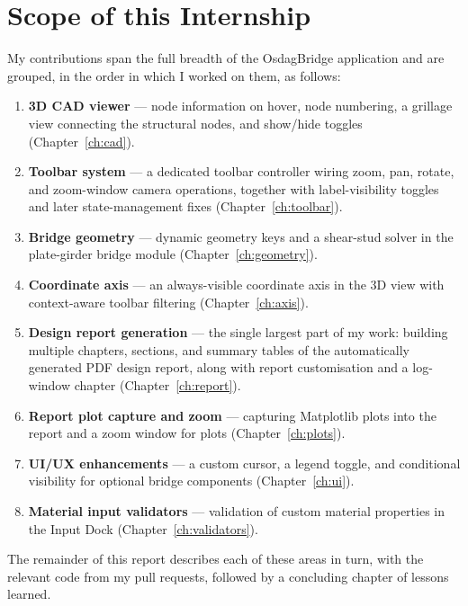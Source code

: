 \section{Scope of this Internship}
My contributions span the full breadth of the OsdagBridge application and are grouped, in the
order in which I worked on them, as follows:
\begin{enumerate}[leftmargin=1.6em]
  \item \textbf{3D CAD viewer} --- node information on hover, node numbering, a grillage view
        connecting the structural nodes, and show/hide toggles (Chapter~\ref{ch:cad}).
  \item \textbf{Toolbar system} --- a dedicated toolbar controller wiring zoom, pan, rotate,
        and zoom-window camera operations, together with label-visibility toggles and later
        state-management fixes (Chapter~\ref{ch:toolbar}).
  \item \textbf{Bridge geometry} --- dynamic geometry keys and a shear-stud solver in the
        plate-girder bridge module (Chapter~\ref{ch:geometry}).
  \item \textbf{Coordinate axis} --- an always-visible coordinate axis in the 3D view with
        context-aware toolbar filtering (Chapter~\ref{ch:axis}).
  \item \textbf{Design report generation} --- the single largest part of my work: building
        multiple chapters, sections, and summary tables of the automatically generated PDF
        design report, along with report customisation and a log-window chapter
        (Chapter~\ref{ch:report}).
  \item \textbf{Report plot capture and zoom} --- capturing Matplotlib plots into the report
        and a zoom window for plots (Chapter~\ref{ch:plots}).
  \item \textbf{UI/UX enhancements} --- a custom cursor, a legend toggle, and conditional
        visibility for optional bridge components (Chapter~\ref{ch:ui}).
  \item \textbf{Material input validators} --- validation of custom material properties in the
        Input Dock (Chapter~\ref{ch:validators}).
\end{enumerate}

The remainder of this report describes each of these areas in turn, with the relevant code
from my pull requests, followed by a concluding chapter of lessons learned.
